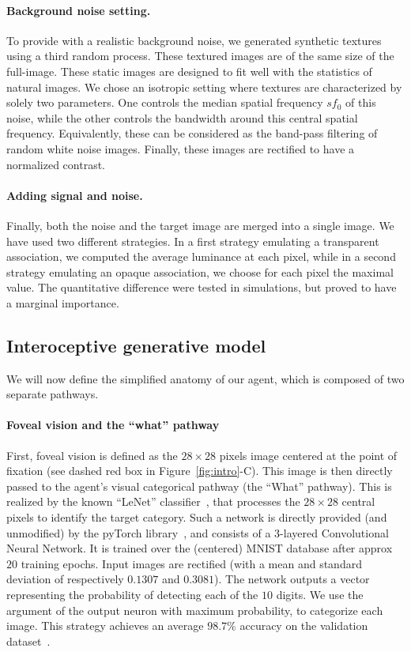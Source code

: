 \paragraph{Background noise setting. } To provide with a realistic background noise, we generated synthetic textures~\citep{Sanz12} using a third random process. These textured images are of the same size of the full-image. These static images are designed to fit well with the statistics of natural images. We chose an isotropic setting where textures are characterized by solely two parameters. One controls the median spatial frequency $sf_0$ of this noise, while the other controls the bandwidth around this central spatial frequency. Equivalently, these can be considered as the band-pass filtering of random white noise images. Finally, these images are rectified to have a normalized contrast.
\paragraph{Adding signal and noise. } Finally, both the noise and the target image are merged into a single image. We have used two different strategies. In a first strategy emulating a transparent association, we computed the average luminance at each pixel, while in a second strategy emulating an opaque association, we choose for each pixel the maximal value. The quantitative difference were tested in simulations, but proved to have a marginal importance.
%
\subsection{Interoceptive generative model}
%
We will now define the simplified anatomy of our agent, which is composed of two separate pathways.
\paragraph{Foveal vision and the ``what'' pathway}
First, foveal vision is defined as the $28\times 28$ pixels image centered at the point of fixation (see dashed red box in Figure~\ref{fig:intro}-C). This image is then directly passed to the agent's visual categorical pathway (the ``What'' pathway). This is realized by the known ``LeNet'' classifier~\citep{Lecun1998}, that processes the $28 \times 28$ central pixels to identify the target category. Such a network is directly provided (and unmodified) by the pyTorch library~\citep{Paszke17}, and consists of a 3-layered Convolutional Neural Network. It is trained over the (centered) MNIST database after approx $20$ training epochs. Input images are rectified (with a mean and standard deviation of respectively $0.1307$ and $0.3081$). The network outputs a vector representing the probability of detecting each of the $10$ digits. We use the argument of the output neuron with maximum probability, to categorize each image. This strategy achieves an average $98.7\%$ accuracy on the validation dataset~\citep{Lecun1998}. %

